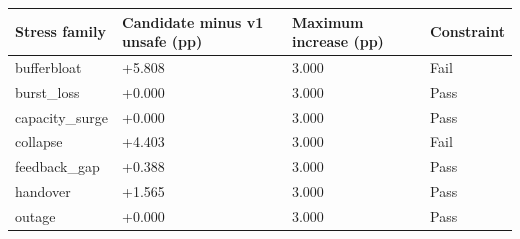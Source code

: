\begin{tabular}{llll}
\toprule
Stress family & Candidate minus v1 unsafe (pp) & Maximum increase (pp) & Constraint \\
\midrule
bufferbloat & +5.808 & 3.000 & Fail \\
burst\_loss & +0.000 & 3.000 & Pass \\
capacity\_surge & +0.000 & 3.000 & Pass \\
collapse & +4.403 & 3.000 & Fail \\
feedback\_gap & +0.388 & 3.000 & Pass \\
handover & +1.565 & 3.000 & Pass \\
outage & +0.000 & 3.000 & Pass \\
\bottomrule
\end{tabular}
